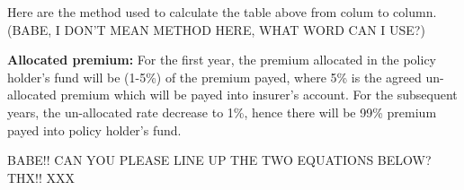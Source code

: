 \documentclass{report}
\begin{document}





Here are the method used to calculate the table above from colum to column.  (BABE, I DON'T MEAN METHOD HERE, WHAT WORD CAN I USE?)

\textbf{Allocated premium:} For the first year, the premium allocated in the policy holder's fund will be (1-5\%) of the premium payed, where 5\% is the agreed un-allocated premium which will be payed into insurer's account. For the subsequent years, the un-allocated rate decrease to 1\%, hence there will be 99\% premium payed into policy holder's fund.

BABE!! CAN YOU PLEASE LINE UP THE TWO EQUATIONS BELOW? THX!! XXX
\end{document}
